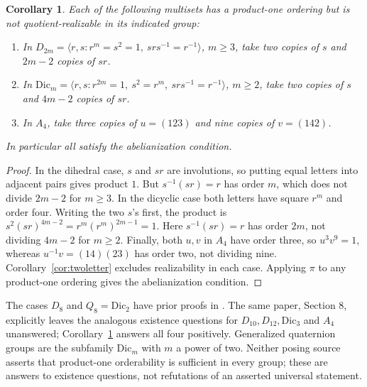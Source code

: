 \documentclass[11pt]{article}
\newtheorem{corollary}[theorem]{Corollary}
\begin{document}
\begin{corollary}\label{cor:strong}
Each of the following multisets has a product-one ordering but is not
quotient-realizable in its indicated group:
\begin{enumerate}
\item In $D_{2m}=\langle r,s:r^m=s^2=1,\ srs^{-1}=r^{-1}\rangle$,
      $m\geq3$, take two copies of $s$ and $2m-2$ copies of $sr$.
\item In $\mathrm{Dic}_m=\langle r,s:r^{2m}=1,\ s^2=r^m,
      \ srs^{-1}=r^{-1}\rangle$, $m\geq2$, take two copies of $s$
      and $4m-2$ copies of $sr$.
\item In $A_4$, take three copies of $u=(123)$ and nine copies of $v=(142)$.
\end{enumerate}
In particular all satisfy the abelianization condition.
\end{corollary}
\begin{proof}
In the dihedral case, $s$ and $sr$ are involutions, so putting equal
letters into adjacent pairs gives product $1$. But
$s^{-1}(sr)=r$ has order $m$, which does not divide $2m-2$ for $m\geq3$.
In the dicyclic case both letters have square $r^m$ and order four.
Writing the two $s$'s first, the product is
$s^2(sr)^{4m-2}=r^m(r^m)^{2m-1}=1$.
Here $s^{-1}(sr)=r$ has order $2m$, not dividing $4m-2$ for $m\geq2$.
Finally, both $u,v$ in $A_4$ have order three, so $u^3v^9=1$,
whereas $u^{-1}v=(14)(23)$ has order two, not dividing nine.
Corollary~\ref{cor:twoletter} excludes realizability in each case.
Applying $\pi$ to any product-one ordering gives the abelianization condition.
\end{proof}
The cases $D_8$ and $Q_8=\mathrm{Dic}_2$ have prior proofs in
\cite[Theorems 5.2 and 6.2]{KSL}. The same paper, Section 8, explicitly
leaves the analogous existence questions for $D_{10},D_{12},\mathrm{Dic}_3$
and $A_4$ unanswered; Corollary~\ref{cor:strong} answers all four positively.
Generalized quaternion groups are the subfamily $\mathrm{Dic}_m$ with
$m$ a power of two. Neither posing source asserts that product-one
orderability is sufficient in every group; these are answers to existence
questions, not refutations of an asserted universal statement.
\end{document}
